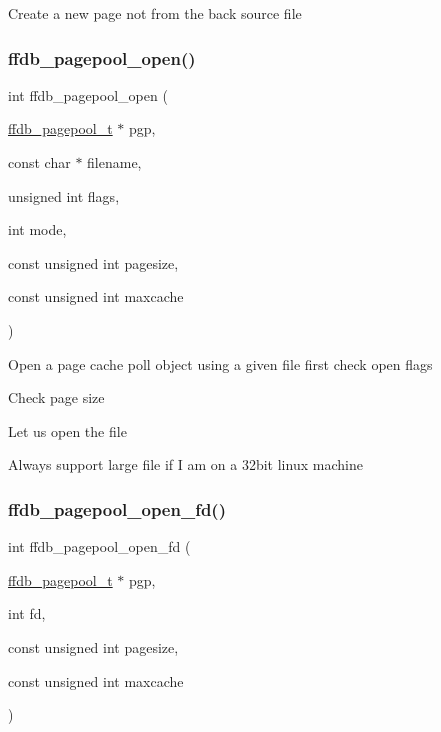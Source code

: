 Create a new page not from the back source file \mbox{\label{adat-devel_2other__libs_2filedb_2filehash_2ffdb__pagepool_8c_ac2ee0d0b33af66cbccec9b243e2e3bc2}} 
\subsubsection{\texorpdfstring{ffdb\_pagepool\_open()}{ffdb\_pagepool\_open()}}
{\footnotesize\ttfamily int ffdb\+\_\+pagepool\+\_\+open (\begin{DoxyParamCaption}\item[{\mbox{\hyperlink{adat-devel_2other__libs_2filedb_2filehash_2ffdb__pagepool_8h_a73290f737b0e5f8be90a0fa96ddf6ab6}{ffdb\+\_\+pagepool\+\_\+t}} $\ast$}]{pgp,  }\item[{const char $\ast$}]{filename,  }\item[{unsigned int}]{flags,  }\item[{int}]{mode,  }\item[{const unsigned int}]{pagesize,  }\item[{const unsigned int}]{maxcache }\end{DoxyParamCaption})}

Open a page cache poll object using a given file first check open flags

Check page size

Let us open the file

Always support large file if I am on a 32bit linux machine\mbox{\label{adat-devel_2other__libs_2filedb_2filehash_2ffdb__pagepool_8c_a99e8cd4bfa26d6f079224a140267e29d}} 
\subsubsection{\texorpdfstring{ffdb\_pagepool\_open\_fd()}{ffdb\_pagepool\_open\_fd()}}
{\footnotesize\ttfamily int ffdb\+\_\+pagepool\+\_\+open\+\_\+fd (\begin{DoxyParamCaption}\item[{\mbox{\hyperlink{adat-devel_2other__libs_2filedb_2filehash_2ffdb__pagepool_8h_a73290f737b0e5f8be90a0fa96ddf6ab6}{ffdb\+\_\+pagepool\+\_\+t}} $\ast$}]{pgp,  }\item[{int}]{fd,  }\item[{const unsigned int}]{pagesize,  }\item[{const unsigned int}]{maxcache }\end{DoxyParamCaption})}

